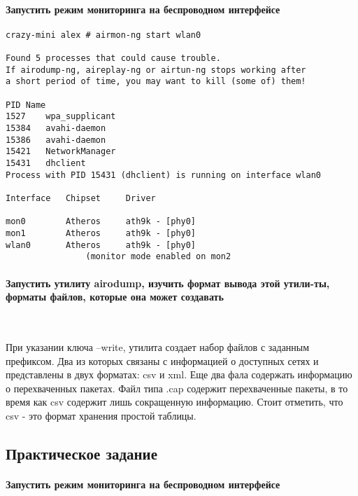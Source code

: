 \documentclass{article}
\begin{document}
\paragraph{Запустить режим мониторинга на беспроводном интерфейсе}

\begin{verbatim}
crazy-mini alex # airmon-ng start wlan0

Found 5 processes that could cause trouble.
If airodump-ng, aireplay-ng or airtun-ng stops working after
a short period of time, you may want to kill (some of) them!

PID	Name
1527	wpa_supplicant
15384	avahi-daemon
15386	avahi-daemon
15421	NetworkManager
15431	dhclient
Process with PID 15431 (dhclient) is running on interface wlan0

Interface	Chipset		Driver

mon0		Atheros 	ath9k - [phy0]
mon1		Atheros 	ath9k - [phy0]
wlan0		Atheros 	ath9k - [phy0]
				(monitor mode enabled on mon2
\end{verbatim}

\paragraph{Запустить утилиту airodump, изучить формат вывода этой утили-ты, форматы файлов, которые она может создавать}
~

При указании ключа --write, утилита создает набор файлов с заданным префиксом. Два из которых связаны с информацией о доступных сетях и представлены в двух форматах: csv и xml. Еще два фала содержать информацию о перехваченных пакетах. Файл типа .cap содержит перехваченные пакеты, в то время как csv содержит лишь сокращенную информацию. Стоит отметить, что csv - это формат хранения простой таблицы.

\subsection{Практическое задание}

\paragraph{Запустить режим мониторинга на беспроводном интерфейсе}
~
\end{document}
